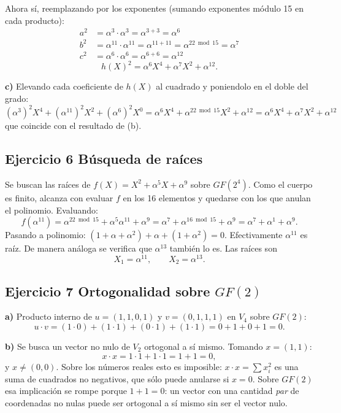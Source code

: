 \documentclass[11pt]{article}
\begin{document}
Ahora sí, reemplazando por los exponentes (sumando exponentes módulo 15 en cada producto):
\begin{align*}
a^2 &= \alpha^3\cdot\alpha^3 = \alpha^{3+3}=\alpha^6 \\
b^2 &= \alpha^{11}\cdot\alpha^{11} = \alpha^{11+11}=\alpha^{22\bmod15}=\alpha^7 \\
c^2 &= \alpha^6\cdot\alpha^6 = \alpha^{6+6}=\alpha^{12}
\end{align*}
$$h(X)^2 = \alpha^6X^4 + \alpha^7X^2 + \alpha^{12}.$$

\textbf{c)} Elevando cada coeficiente de $h(X)$ al cuadrado y poniendolo en el doble del grado:
$$(\alpha^3)^2 X^{4} + (\alpha^{11})^2 X^{2} + (\alpha^6)^2 X^{0}
= \alpha^{6}X^4 + \alpha^{22\bmod 15}X^2 + \alpha^{12} = \alpha^6X^4+\alpha^7X^2+\alpha^{12}$$ que coincide con el resultado de (b). 

\subsection*{Ejercicio 6 Búsqueda de raíces}

Se buscan las raíces de $f(X)=X^2+\alpha^5X+\alpha^9$ sobre $GF(2^4)$. Como el cuerpo es
finito, alcanza con evaluar $f$ en los 16 elementos y quedarse con los que anulan el
polinomio. Evaluando:
$$f(\alpha^{11}) = \alpha^{22\bmod15}+\alpha^{5}\alpha^{11}+\alpha^9 = \alpha^7+\alpha^{16\bmod15}+\alpha^9 = \alpha^7+\alpha^1+\alpha^9.$$
Pasando a polinomio: $(1+\alpha+\alpha^2)+\alpha+(1+\alpha^2) = 0$. Efectivamente $\alpha^{11}$
es raíz. De manera análoga se verifica que $\alpha^{13}$ también lo es. Las raíces son
$$X_1=\alpha^{11}, \qquad X_2=\alpha^{13}.$$

\subsection*{Ejercicio 7 Ortogonalidad sobre $GF(2)$}

\textbf{a)} Producto interno de $u=(1,1,0,1)$ y $v=(0,1,1,1)$ en $V_4$ sobre $GF(2)$:
$$u\cdot v = (1\cdot0)+(1\cdot1)+(0\cdot1)+(1\cdot1) = 0+1+0+1 = 0.$$

\textbf{b)} Se busca un vector no nulo de $V_2$ ortogonal a sí mismo. Tomando $x=(1,1)$:
$$x\cdot x = 1\cdot1+1\cdot1 = 1+1 = 0,$$
y $x\neq(0,0)$. Sobre los números reales esto es imposible: $x\cdot x=\sum x_i^2$ es una suma
de cuadrados no negativos, que sólo puede anularse si $x=0$. Sobre $GF(2)$ esa implicación se
rompe porque $1+1=0$: un vector con una cantidad
\emph{par} de coordenadas no nulas puede ser ortogonal a sí mismo sin ser el vector nulo.
\end{document}
